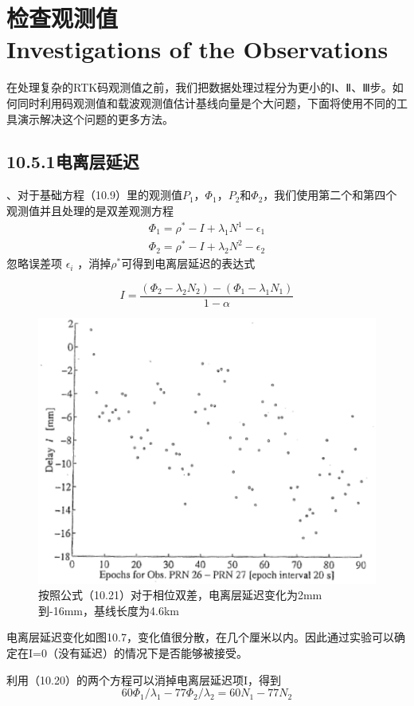\section[检查观测值]{检查观测值\\Investigations of the Observations}
在处理复杂的RTK码观测值之前，我们把数据处理过程分为更小的Ⅰ、Ⅱ、Ⅲ步。如何同时利用码观测值和载波观测值估计基线向量是个大问题，下面将使用不同的工具演示解决这个问题的更多方法。

\subsection{10.5.1电离层延迟}

\uppercase\expandafter{}、对于基础方程（10.9）里的观测值$P_{1}$，$\Phi_{1}$，$P_{2}$和$\Phi_{2}$，我们使用第二个和第四个观测值并且处理的是双差观测方程
\begin{equation}
	\begin{split}
		\Phi_{1}=\rho^{*}-I+\lambda_{1}N^{1}-\epsilon_{1}\\
		\Phi_{2}=\rho^{*}-I+\lambda_{2}N^{2}-\epsilon_{2}
	\end{split}
\end{equation}
忽略误差项 $\epsilon_{i}$ ，消掉$\rho^{*}$可得到电离层延迟的表达式

\begin{equation}
	I=\frac{(\Phi_{2}-\lambda_{2}N_{2})-(\Phi_{1}-\lambda_{1}N_{1})}{1-\alpha}
\end{equation}

\begin{figure}
	\centering
	\includegraphics[width=0.4\linewidth]{TeX_files/Part03/chapter10/image/9-7}
	\caption{按照公式（10.21）对于相位双差，电离层延迟变化为2mm到-16mm，基线长度为4.6km}
	\label{fig:9-7}
\end{figure}

电离层延迟变化如图10.7，变化值很分散，在几个厘米以内。因此通过实验可以确定在I=0（没有延迟）的情况下是否能够被接受。

利用（10.20）的两个方程可以消掉电离层延迟项I，得到
\begin{equation}
	60\Phi_{1}/\lambda_{1}-77\Phi_{2}/\lambda_{2}=60N_{1}-77N_{2}
\end{equation}

